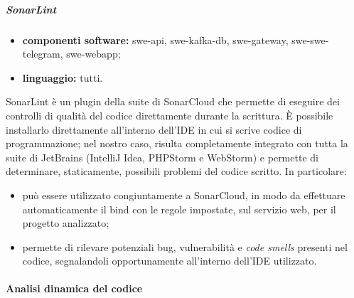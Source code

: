                 \subparagraph{SonarLint}

                \begin{itemize}
                    \item \textbf{componenti software:} swe-api, swe-kafka-db, swe-gateway, swe-swe-telegram, swe-webapp;
                    \item \textbf{linguaggio:} tutti.
                \end{itemize}

                SonarLint è un plugin della suite di SonarCloud che permette di eseguire dei controlli di qualità del codice direttamente durante la scrittura. È possibile installarlo direttamente all'interno dell'IDE in cui si scrive codice di programmazione; nel nostro caso, risulta completamente integrato con tutta la suite di JetBrains (IntelliJ Idea, PHPStorm e WebStorm) e permette di determinare, staticamente, possibili problemi del codice scritto. In particolare:
	            \begin{itemize}
	            	\item può essere utilizzato congiuntamente a SonarCloud, in modo da effettuare automaticamente il bind con le regole impostate, sul servizio web, per il progetto analizzato;
	            	\item permette di rilevare potenziali bug, vulnerabilità e \textit{code smells} presenti nel codice, segnalandoli opportunamente all'interno dell'IDE utilizzato.
	            \end{itemize}
                
		
		\paragraph{Analisi dinamica del codice}
                
